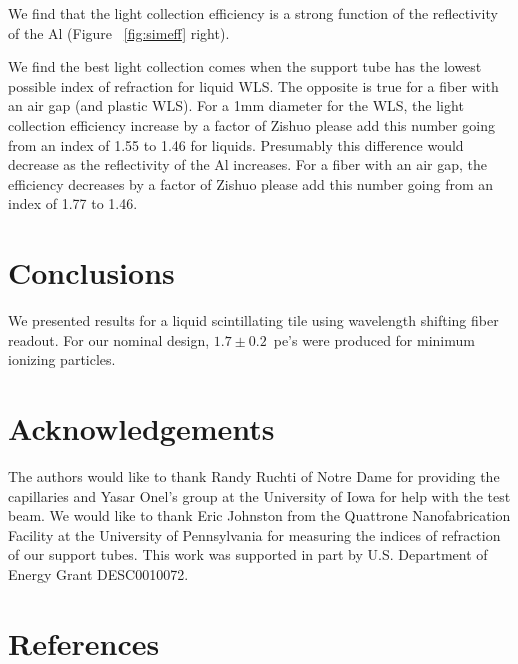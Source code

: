 \documentclass[review]{elsarticle}
\begin{document}
We find that the light collection efficiency is a strong function of
the reflectivity of the Al (Figure ~\ref{fig:simeff} right).

We find the best light collection comes when the support tube has the
lowest possible index of refraction for liquid WLS. The opposite is
true for a fiber with an air gap (and plastic WLS). For a 1mm
diameter for the WLS, the light collection efficiency increase by a
factor of {\color{red} Zishuo please add this number} going from an
index of 1.55 to 1.46 for liquids. Presumably this difference would
decrease as the reflectivity of the Al increases. For a fiber with an
air gap, the efficiency decreases by a factor of {\color{red} Zishuo
 please add this number} going from an index of 1.77 to 1.46.

\section{Conclusions}

We presented results for a liquid scintillating tile using wavelength
shifting fiber readout. For our nominal design, $1.7\pm 0.2$~pe's
were produced for minimum ionizing particles.

\section{Acknowledgements}
The authors would like to thank Randy Ruchti of Notre Dame for
providing the capillaries and Yasar Onel's group at the University of
Iowa for help with the test beam. We would like to thank Eric
Johnston from the Quattrone Nanofabrication Facility at the University
of Pennsylvania for measuring the indices of refraction of our support
tubes. This work was supported in part by U.S. Department of Energy
Grant DESC0010072.

\section*{References}


\end{document}
